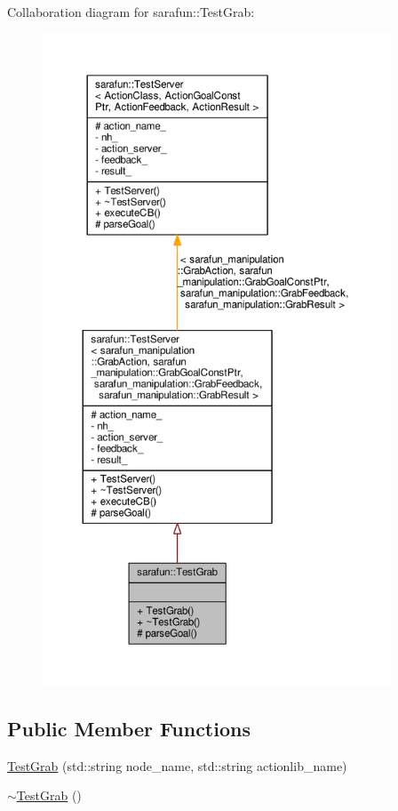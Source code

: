 Collaboration diagram for sarafun\-:\-:Test\-Grab\-:\nopagebreak
\begin{figure}[H]
\begin{center}
\leavevmode
\includegraphics[height=550pt]{d9/deb/classsarafun_1_1TestGrab__coll__graph}
\end{center}
\end{figure}
\subsection*{Public Member Functions}
\begin{DoxyCompactItemize}
\item 
\hyperlink{classsarafun_1_1TestGrab_a3f9ee23df0bde4b2e8e48d1bc6f942b7_a3f9ee23df0bde4b2e8e48d1bc6f942b7}{Test\-Grab} (std\-::string node\-\_\-name, std\-::string actionlib\-\_\-name)
\item 
\hyperlink{classsarafun_1_1TestGrab_a68d490aee932b31716030f11ad969fdf_a68d490aee932b31716030f11ad969fdf}{$\sim$\-Test\-Grab} ()
\end{DoxyCompactItemize}
